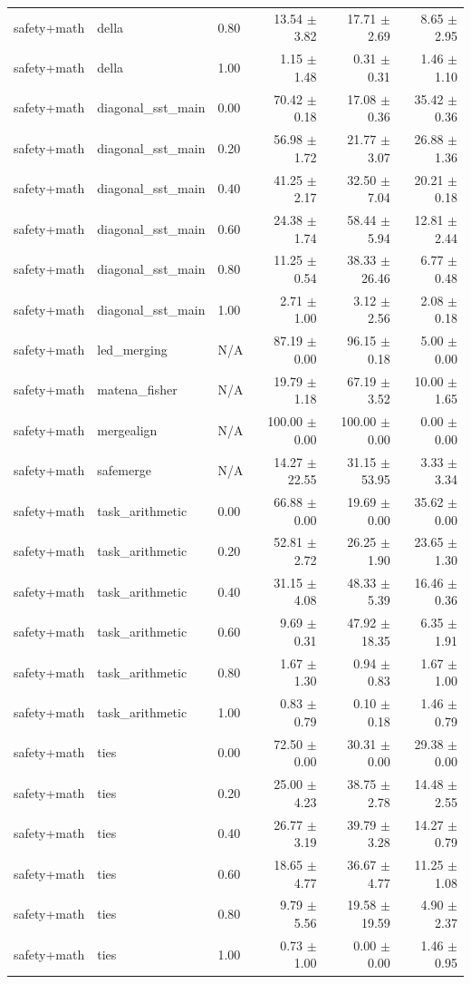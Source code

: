 \documentclass{article}
\begin{document}
\begin{table}[H]
{\begin{tabular}{lllrrr}
safety+math & della & 0.80 & 13.54 $\pm$ 3.82 & 17.71 $\pm$ 2.69 & 8.65 $\pm$ 2.95 \\
safety+math & della & 1.00 & 1.15 $\pm$ 1.48 & 0.31 $\pm$ 0.31 & 1.46 $\pm$ 1.10 \\
safety+math & diagonal\_sst\_main & 0.00 & 70.42 $\pm$ 0.18 & 17.08 $\pm$ 0.36 & 35.42 $\pm$ 0.36 \\
safety+math & diagonal\_sst\_main & 0.20 & 56.98 $\pm$ 1.72 & 21.77 $\pm$ 3.07 & 26.88 $\pm$ 1.36 \\
safety+math & diagonal\_sst\_main & 0.40 & 41.25 $\pm$ 2.17 & 32.50 $\pm$ 7.04 & 20.21 $\pm$ 0.18 \\
safety+math & diagonal\_sst\_main & 0.60 & 24.38 $\pm$ 1.74 & 58.44 $\pm$ 5.94 & 12.81 $\pm$ 2.44 \\
safety+math & diagonal\_sst\_main & 0.80 & 11.25 $\pm$ 0.54 & 38.33 $\pm$ 26.46 & 6.77 $\pm$ 0.48 \\
safety+math & diagonal\_sst\_main & 1.00 & 2.71 $\pm$ 1.00 & 3.12 $\pm$ 2.56 & 2.08 $\pm$ 0.18 \\
safety+math & led\_merging & N/A & 87.19 $\pm$ 0.00 & 96.15 $\pm$ 0.18 & 5.00 $\pm$ 0.00 \\
safety+math & matena\_fisher & N/A & 19.79 $\pm$ 1.18 & 67.19 $\pm$ 3.52 & 10.00 $\pm$ 1.65 \\
safety+math & mergealign & N/A & 100.00 $\pm$ 0.00 & 100.00 $\pm$ 0.00 & 0.00 $\pm$ 0.00 \\
safety+math & safemerge & N/A & 14.27 $\pm$ 22.55 & 31.15 $\pm$ 53.95 & 3.33 $\pm$ 3.34 \\
safety+math & task\_arithmetic & 0.00 & 66.88 $\pm$ 0.00 & 19.69 $\pm$ 0.00 & 35.62 $\pm$ 0.00 \\
safety+math & task\_arithmetic & 0.20 & 52.81 $\pm$ 2.72 & 26.25 $\pm$ 1.90 & 23.65 $\pm$ 1.30 \\
safety+math & task\_arithmetic & 0.40 & 31.15 $\pm$ 4.08 & 48.33 $\pm$ 5.39 & 16.46 $\pm$ 0.36 \\
safety+math & task\_arithmetic & 0.60 & 9.69 $\pm$ 0.31 & 47.92 $\pm$ 18.35 & 6.35 $\pm$ 1.91 \\
safety+math & task\_arithmetic & 0.80 & 1.67 $\pm$ 1.30 & 0.94 $\pm$ 0.83 & 1.67 $\pm$ 1.00 \\
safety+math & task\_arithmetic & 1.00 & 0.83 $\pm$ 0.79 & 0.10 $\pm$ 0.18 & 1.46 $\pm$ 0.79 \\
safety+math & ties & 0.00 & 72.50 $\pm$ 0.00 & 30.31 $\pm$ 0.00 & 29.38 $\pm$ 0.00 \\
safety+math & ties & 0.20 & 25.00 $\pm$ 4.23 & 38.75 $\pm$ 2.78 & 14.48 $\pm$ 2.55 \\
safety+math & ties & 0.40 & 26.77 $\pm$ 3.19 & 39.79 $\pm$ 3.28 & 14.27 $\pm$ 0.79 \\
safety+math & ties & 0.60 & 18.65 $\pm$ 4.77 & 36.67 $\pm$ 4.77 & 11.25 $\pm$ 1.08 \\
safety+math & ties & 0.80 & 9.79 $\pm$ 5.56 & 19.58 $\pm$ 19.59 & 4.90 $\pm$ 2.37 \\
safety+math & ties & 1.00 & 0.73 $\pm$ 1.00 & 0.00 $\pm$ 0.00 & 1.46 $\pm$ 0.95 \\
\bottomrule
\end{tabular}
}
\end{table}
\end{document}
